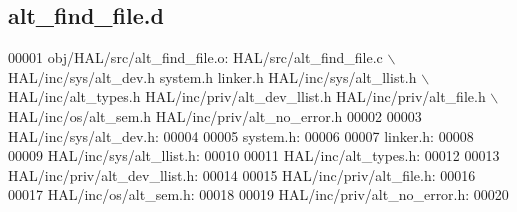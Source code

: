 \subsection{alt\+\_\+find\+\_\+file.\+d}
\label{alt__find__file_8d_source}

\begin{DoxyCode}
00001 obj/HAL/src/alt_find_file.o: HAL/src/alt_find_file.c \(\backslash\)
 HAL/inc/sys/alt_dev.h system.h linker.h HAL/inc/sys/alt_llist.h \(\backslash\)
 HAL/inc/alt\_types.h HAL/inc/priv/alt_dev_llist.h HAL/inc/priv/alt\_file.h \(\backslash\)
 HAL/inc/os/alt\_sem.h HAL/inc/priv/alt_no_error.h
00002 
00003 HAL/inc/sys/alt_dev.h:
00004 
00005 system.h:
00006 
00007 linker.h:
00008 
00009 HAL/inc/sys/alt_llist.h:
00010 
00011 HAL/inc/alt\_types.h:
00012 
00013 HAL/inc/priv/alt_dev_llist.h:
00014 
00015 HAL/inc/priv/alt\_file.h:
00016 
00017 HAL/inc/os/alt\_sem.h:
00018 
00019 HAL/inc/priv/alt_no_error.h:
00020 \end{DoxyCode}
